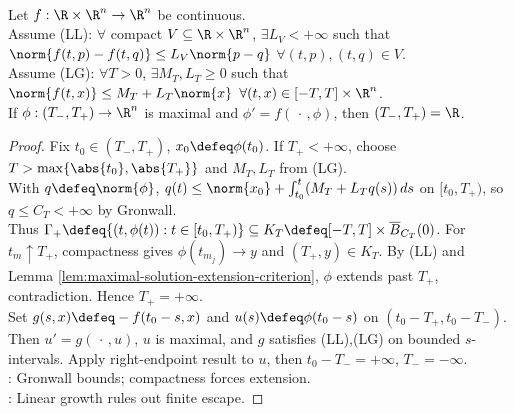 \begin{corollary} \label{cor:global-ode-solutions-linear-growth} \\
Let $f:\R\times\R^n\to\R^n$ be continuous.\\
Assume (LL): $\forall$ compact $V\subseteq\R\times\R^n$, $\exists L_V<+\infty$ such that $\norm{f(t,p)-f(t,q)}\leq L_V\norm{p-q}$ $\forall (t,p),(t,q)\in V$.\\
Assume (LG): $\forall T>0$, $\exists M_T,L_T\geq0$ such that $\norm{f(t,x)}\leq M_T+L_T\norm{x}$ $\forall (t,x)\in[-T,T]\times\R^n$.\\
If $\phi:(T_-,T_+)\to\R^n$ is maximal and $\phi'=f(\,\cdot\,,\phi)$, then $(T_-,T_+)=\R$.
\begin{proof} Fix $t_0\in(T_-,T_+)$, $x_0\defeq\phi(t_0)$. If $T_+<+\infty$, choose $T>\max\{\abs{t_0},\abs{T_+}\}$ and $M_T,L_T$ from (LG).\\
With $q\defeq\norm{\phi}$, $q(t)\leq\norm{x_0}+\int_{t_0}^t(M_T+L_Tq(s))\,ds$ on $[t_0,T_+)$, so $q\leq C_T<+\infty$ by Gronwall.\\
Thus $\Gamma_+\defeq\{(t,\phi(t)):t\in[t_0,T_+)\}\subseteq K_T\defeq[-T,T]\times\overline B_{C_T}(0)$. For $t_m\uparrow T_+$, compactness gives $\phi(t_{m_j})\to y$ and $(T_+,y)\in K_T$. By (LL) and Lemma \ref{lem:maximal-solution-extension-criterion}, $\phi$ extends past $T_+$, contradiction. Hence $T_+=+\infty$.\\
Set $g(s,x)\defeq-f(t_0-s,x)$ and $u(s)\defeq\phi(t_0-s)$ on $(t_0-T_+,t_0-T_-)$. Then $u'=g(\,\cdot\,,u)$, $u$ is maximal, and $g$ satisfies (LL),(LG) on bounded $s$-intervals. Apply right-endpoint result to $u$, then $t_0-T_-=+\infty$, $T_-=-\infty$.\\
: Gronwall bounds; compactness forces extension.\\
: Linear growth rules out finite escape.
\end{proof}
\end{corollary}

